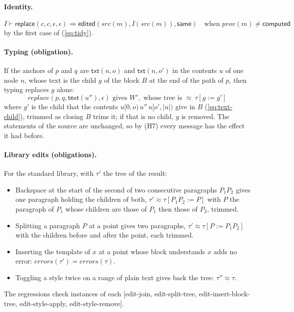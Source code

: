 \documentclass[11pt]{article}
\numberwithin{equation}{section}
\newcommand{\kw}[1]{\ensuremath{\mathsf{#1}}}
\begin{document}
\paragraph{Identity.}
\begin{equation}\label{eq:law-identity}
I \vdash \kw{replace}(c, c, \epsilon, \epsilon) \Rightarrow
  \kw{edited}(\mathit{src}(m), I(\mathit{src}(m)), \kw{same})
\quad\text{when } \mathit{prov}(m) \neq \kw{computed}
\end{equation}
by the first case of (\ref{eq:tidy}).

\paragraph{Typing (obligation).}
If the anchors of $p$ and $q$ are $\kw{txt}(n, o)$ and $\kw{txt}(n, o')$
in the contents $u$ of one node $n$, whose text is the child $g$ of the
block $B$ at the end of the path of $p$, then typing replaces $g$ alone:
\begin{equation}\label{eq:edit-typing}
\mathit{replace}(p, q, \kw{text}(u''), \epsilon) \text{ gives } W', \text{ whose
tree is } \approx\ \tau[g := g']
\end{equation}
where $g'$ is the child that the contents $u[0, o)\,u''\,u[o', |u|)$ give in
$B$ (\ref{eq:text-child}), trimmed as closing $B$ trims it; if that is no
child, $g$ is removed.  The statements of the source are unchanged, so by
(H7) every message has the effect it had before.

\paragraph{Library edits (obligations).}  For the standard library, with
$\tau'$ the tree of the result:
\begin{itemize}
\item Backspace at the start of the second of two consecutive paragraphs
      $P_1 P_2$ gives one paragraph holding the children of both,
      $\tau' \approx \tau[P_1 P_2 := P]$ with $P$ the paragraph of
      $P_1$ whose children are those of $P_1$ then those of $P_2$, trimmed.
\item Splitting a paragraph $P$ at a point gives two paragraphs, $\tau'
      \approx \tau[P := P_1 P_2]$ with the children before and after the
      point, each trimmed.
\item Inserting the template of $x$ at a point whose block understands $x$
      adds no error: $\mathit{errors}(\tau') = \mathit{errors}(\tau)$.
\item Toggling a style twice on a range of plain text gives back the tree:
      $\tau'' \approx \tau$.
\end{itemize}
The regressions check instances of each [edit-join, edit-split-tree,
edit-insert-block-tree, edit-style-apply, edit-style-remove].
\end{document}
